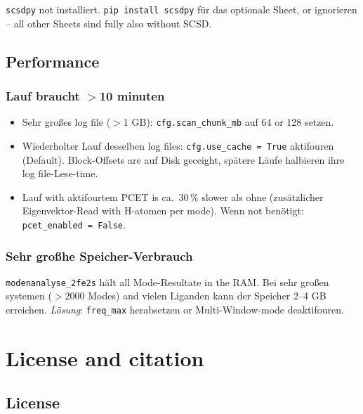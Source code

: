 \documentclass[11pt,a4paper,twoside]{article}
\theoremstyle{remark}
\begin{document}
\texttt{scsdpy} not installiert. \texttt{pip install scsdpy} f\"ur
das optionale Sheet, or ignorieren -- all other Sheets sind
fully also without SCSD.

\subsection{Performance}

\subsubsection*{Lauf braucht $>$10 minuten}

\begin{itemize}
  \item Sehr gro\ss es log file ($>$1 GB): \texttt{cfg.scan\_chunk\_mb}
        auf 64 or 128 setzen.
  \item Wiederholter Lauf desselben log files: \texttt{cfg.use\_cache =
        True} aktifouren (Default). Block-Offsets are auf Disk
        geceight, sp\"atere L\"aufe halbieren ihre log file-Lese-time.
  \item Lauf with aktifourtem PCET is ca.\ 30\,\% slower als ohne
        (zus\"atzlicher Eigenvektor-Read with H-atomen per mode). Wenn
        not ben\"otigt: \texttt{pcet\_enabled = False}.
\end{itemize}

\subsubsection*{Sehr gro\ss he Speicher-Verbrauch}

\texttt{modenanalyse\_2fe2s} h\"alt all Mode-Resultate in the RAM. Bei
sehr gro\ss en systemen ($>$2000 Modes) and vielen Liganden kann der
Speicher 2--4 GB erreichen. \emph{L\"osung}: \texttt{freq\_max}
herabsetzen or Multi-Window-mode deaktifouren.



\section{License and citation}
\label{sec:lizenz}

\subsection{License}
\end{document}
